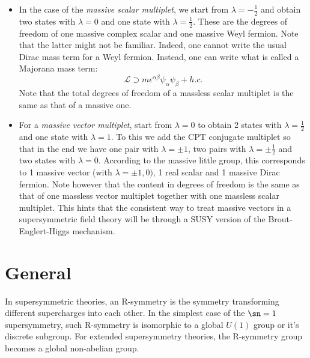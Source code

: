 \begin{example}
  \mbox{}
  \begin{itemize}
    \item In the case of the \textit{massive scalar multiplet}, we start from
      $\lambda =  -\frac{1}{2}$ and obtain two states with $\lambda=0$ and one
      state with $\lambda=\frac{1}{2}$. These are the degrees of freedom of one
      massive complex scalar and one massive Weyl fermion. Note that the latter
      might not be familiar. Indeed, one cannot write the usual Dirac mass term
      for a Weyl fermion. Instead, one can write what is called a Majorana mass
      term:
      \begin{equation}
        \mathcal{L}\supset m\epsilon^{\alpha\beta}\psi_\alpha\psi_\beta + h.c.
      \end{equation}
      Note that the total degrees of freedom of a massless scalar multiplet is
      the same as that of a massive one.
    \item For a \textit{massive vector multiplet}, start from $\lambda = 0$ to
      obtain 2 states with $\lambda = \frac{1}{2}$ and one state with $\lambda
      = 1$. To this we add the CPT conjugate multiplet so that in the end we
      have one pair with $\lambda = \pm1$, two pairs with
      $\lambda=\pm\frac{1}{2}$ and two states with $\lambda = 0$. According to
      the massive little group, this corresponds to 1 massive vector (with
      $\lambda = \pm1,0)$, 1 real scalar and 1 massive Dirac fermion. Note
      however that the content in degrees of freedom is the same as that of one
      massless vector multiplet together with one massless scalar multiplet.
      This hints that the consistent way to treat massive vectors in
      a supersymmetric field theory will be through a SUSY version of the
      Brout-Englert-Higgs mechanism.
    \end{itemize}
\section{General}
\begin{definition}[R-symmetry]
In supersymmetric theories, an R-symmetry is the symmetry transforming different supercharges into each other. In the simplest case of the $\sn=1$ supersymmetry, such R-symmetry is isomorphic to a global $U(1)$ group or it's discrete subgroup. For extended supersymmetry theories, the R-symmetry group becomes a global non-abelian group.  
\end{definition}


\end{example}
